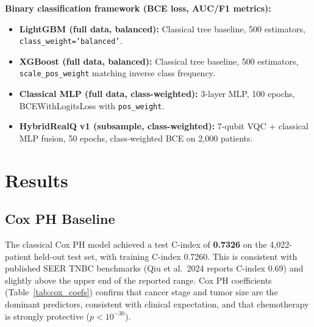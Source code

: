 \documentclass[12pt, letterpaper]{article}
\begin{document}
\noindent\textbf{Binary classification framework (BCE loss, AUC/F1 metrics):}
\begin{itemize}
    \item \textbf{LightGBM (full data, balanced):} Classical tree baseline, 500 estimators, \texttt{class\_weight='balanced'}.
    \item \textbf{XGBoost (full data, balanced):} Classical tree baseline, 500 estimators, \texttt{scale\_pos\_weight} matching inverse class frequency.
    \item \textbf{Classical MLP (full data, class-weighted):} 3-layer MLP, 100 epochs, BCEWithLogitsLoss with \texttt{pos\_weight}.
    \item \textbf{HybridRealQ v1 (subsample, class-weighted):} 7-qubit VQC + classical MLP fusion, 50 epochs, class-weighted BCE on 2{,}000 patients.
\end{itemize}


\section{Results}

\subsection{Cox PH Baseline}

The classical Cox PH model achieved a test C-index of \textbf{0.7326} on the 4{,}022-patient held-out test set, with training C-index 0.7260. This is consistent with published SEER TNBC benchmarks (Qiu et al.\ 2024 reports C-index 0.69) and slightly above the upper end of the reported range. Cox PH coefficients (Table~\ref{tab:cox_coefs}) confirm that cancer stage and tumor size are the dominant predictors, consistent with clinical expectation, and that chemotherapy is strongly protective ($p < 10^{-30}$).
\end{document}
